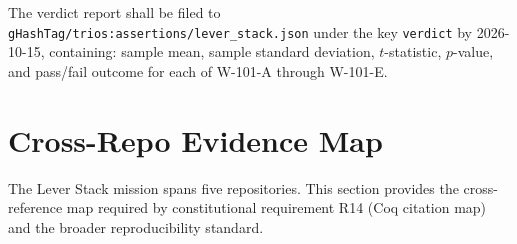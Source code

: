 The verdict report shall be filed to
\texttt{gHashTag/trios:assertions/lever\_stack.json} under the key
\texttt{verdict} by 2026-10-15, containing: sample mean, sample standard
deviation, \(t\)-statistic, \(p\)-value, and pass/fail outcome for each of
W-101-A through W-101-E.

\section{Cross-Repo Evidence Map}
\label{sec:evidence_map}

The Lever Stack mission spans five repositories.  This section provides the
cross-reference map required by constitutional requirement R14
(Coq citation map) and the broader reproducibility standard.

